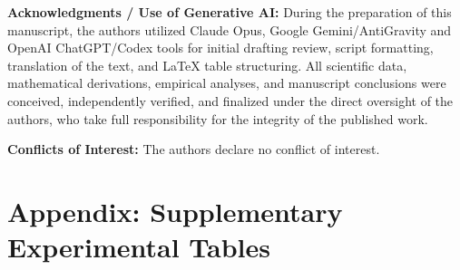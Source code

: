 \documentclass[11pt,a4paper]{article}
\newcommand{\conflictsofinterest}[1]{\par\smallskip\noindent\textbf{Conflicts of Interest: }#1}
\begin{document}
\par\smallskip\noindent\textbf{Acknowledgments / Use of Generative AI: }During the preparation of this manuscript, the authors utilized Claude Opus, Google Gemini/AntiGravity and OpenAI ChatGPT/Codex tools for initial drafting review, script formatting, translation of the text, and LaTeX table structuring. All scientific data, mathematical derivations, empirical analyses, and manuscript conclusions were conceived, independently verified, and finalized under the direct oversight of the authors, who take full responsibility for the integrity of the published work.

\conflictsofinterest{The authors declare no conflict of interest.}




\newpage
\appendix
\section*{Appendix: Supplementary Experimental Tables}
\label{sec:appendix}

\renewcommand{\thetable}{A\arabic{table}}
\setcounter{table}{0}
\end{document}
